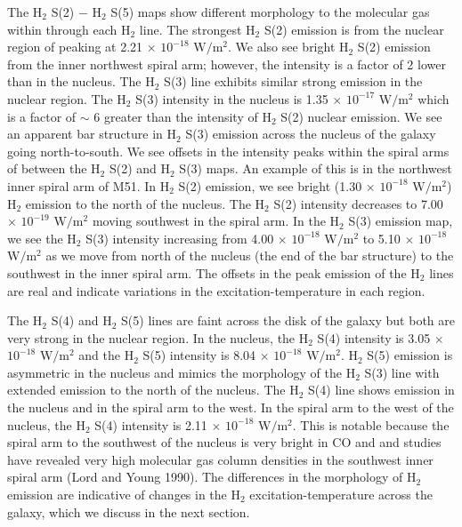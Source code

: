 \documentclass[manuscript]{aastex}
\begin{document}
The $\mathrm{ H_2}$ S(2) $-$ $\mathrm{H_2}$ S(5) maps show different morphology to the molecular gas within  through each $\mathrm{H_2}$ line.  The strongest $\mathrm{H_2}$ S(2) emission is from the nuclear region of  peaking at 2.21 $\times$ $\mathrm{10^{-18}}$ $\mathrm{W/m^2}$.  We also see bright $\mathrm{H_2}$ S(2) emission from the inner northwest spiral arm; however, the intensity is a factor of 2 lower than in the nucleus.  The $\mathrm{H_2}$ S(3) line exhibits similar strong emission in the nuclear region.  The $\mathrm{H_2}$ S(3) intensity in the nucleus is 1.35 $\times$ $\mathrm{10^{-17}}$ $\mathrm{W/m^2}$ which is a factor of $\sim$ 6 greater than the intensity of $\mathrm{H_2}$ S(2) nuclear emission.  We see an apparent bar structure in $\mathrm{H_2}$ S(3) emission across the nucleus of the galaxy going north-to-south.  We see offsets in the intensity peaks within the spiral arms of  between the $\mathrm{H_2}$ S(2) and $\mathrm{H_2}$ S(3) maps.  An example of this is in the northwest inner spiral arm of M51.  In $\mathrm{H_2}$ S(2) emission, we see bright (1.30 $\times$ $\mathrm{10^{-18}}$ $\mathrm{W/m^2}$) $\mathrm{H_2}$ emission to the north of the nucleus.  The $\mathrm{H_2}$ S(2) intensity decreases to 7.00 $\times$ $\mathrm{10^{-19}}$ $\mathrm{W/m^2}$ moving southwest in the spiral arm.  In the $\mathrm{H_2}$ S(3) emission map, we see the $\mathrm{H_2}$ S(3) intensity increasing from 4.00 $\times$ $\mathrm{10^{-18}}$ $\mathrm{W/m^2}$ to 5.10 $\times$ $\mathrm{10^{-18}}$ $\mathrm{W/m^2}$ as we move from north of the nucleus (the end of the bar structure) to the southwest in the inner spiral arm.  The offsets in the peak emission of the $\mathrm{H_2}$ lines are real and indicate variations in the excitation-temperature in each region.

The $\mathrm{H_2}$ S(4) and $\mathrm{H_2}$ S(5)  lines are faint across the disk of the galaxy but both are very strong in the nuclear region.  In the nucleus, the $\mathrm{H_2}$ S(4) intensity is 3.05 $\times$ $\mathrm{10^{-18}}$ $\mathrm{W/m^2}$ and the $\mathrm{H_2}$ S(5) intensity is 8.04 $\times$ $\mathrm{10^{-18}}$ $\mathrm{W/m^2}$.  $\mathrm{H_2}$ S(5) emission is asymmetric in the nucleus and mimics the morphology of the $\mathrm{H_2}$ S(3) line with extended emission to the north of the nucleus.  The $\mathrm{H_2}$ S(4) line shows emission in the nucleus and in the spiral arm to the west.  In the spiral arm to the west of the nucleus, the $\mathrm{H_2}$ S(4) intensity is 2.11 $\times$ $\mathrm{10^{-18}}$ $\mathrm{W/m^2}$.  This is notable because the spiral arm to the southwest of the nucleus is very bright in CO and and studies have revealed very high molecular gas column densities in the southwest inner spiral arm (Lord and Young 1990).  The differences in the morphology of $\mathrm{H_2}$ emission are indicative of changes in the $\mathrm{H_2}$ excitation-temperature across the galaxy, which we discuss in the next section.
\end{document}
